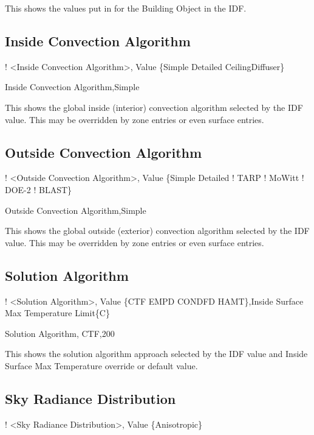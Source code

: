 This shows the values put in for the Building Object in the IDF.

\subsection{Inside Convection Algorithm}\label{inside-convection-algorithm}

! \textless{}Inside Convection Algorithm\textgreater{}, Value \{Simple \textbar{} Detailed \textbar{} CeilingDiffuser\}

Inside Convection Algorithm,Simple

This shows the global inside (interior) convection algorithm selected by the IDF value. This may be overridden by zone entries or even surface entries.

\subsection{Outside Convection Algorithm}\label{outside-convection-algorithm}

! \textless{}Outside Convection Algorithm\textgreater{}, Value \{Simple \textbar{} Detailed ! TARP ! MoWitt ! DOE-2 ! BLAST\}

Outside Convection Algorithm,Simple

This shows the global outside (exterior) convection algorithm selected by the IDF value. This may be overridden by zone entries or even surface entries.

\subsection{Solution Algorithm}\label{solution-algorithm}

! \textless{}Solution Algorithm\textgreater{}, Value \{CTF \textbar{} EMPD \textbar{} CONDFD \textbar{} HAMT\},Inside Surface Max Temperature Limit\{C\}

Solution Algorithm, CTF,200

This shows the solution algorithm approach selected by the IDF value and Inside Surface Max Temperature override or default value.

\subsection{Sky Radiance Distribution}\label{sky-radiance-distribution}

! \textless{}Sky Radiance Distribution\textgreater{}, Value \{Anisotropic\}

